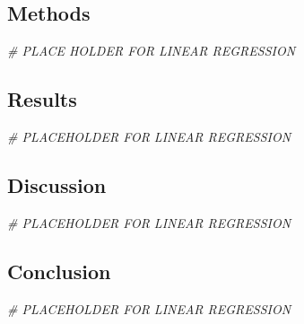 \documentclass[]{article}
\newenvironment{Shaded}{\begin{snugshade}}{\end{snugshade}}
\newcommand{\CommentTok}[1]{\textcolor[rgb]{0.56,0.35,0.01}{\textit{#1}}}
\begin{document}
\hypertarget{methods}{%
\subsection{Methods}\label{methods}}

\begin{Shaded}
\begin{Highlighting}[]
\CommentTok{# PLACE HOLDER FOR LINEAR REGRESSION}
\end{Highlighting}
\end{Shaded}

\hypertarget{results}{%
\subsection{Results}\label{results}}

\begin{Shaded}
\begin{Highlighting}[]
\CommentTok{# PLACEHOLDER FOR LINEAR REGRESSION}
\end{Highlighting}
\end{Shaded}

\hypertarget{discussion}{%
\subsection{Discussion}\label{discussion}}

\begin{Shaded}
\begin{Highlighting}[]
\CommentTok{# PLACEHOLDER FOR LINEAR REGRESSION}
\end{Highlighting}
\end{Shaded}

\hypertarget{conclusion}{%
\subsection{Conclusion}\label{conclusion}}

\begin{Shaded}
\begin{Highlighting}[]
\CommentTok{# PLACEHOLDER FOR LINEAR REGRESSION}
\end{Highlighting}
\end{Shaded}
\end{document}
